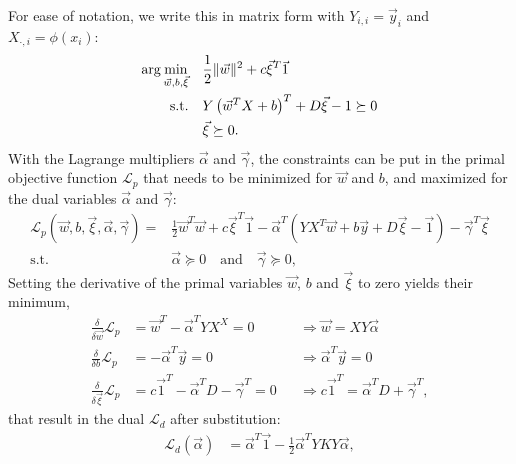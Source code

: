 %
For ease of notation, we write this in matrix form 
with $Y_{i,i} = \vec{y}_i$ and $X_{\cdot,i} = \phi(x_i)$:
\begin{align}
  \arg\min_{\vec{w}, b, \vec{\xi}} \quad
  & \frac{1}{2}\lVert\vec{w}\rVert^2
  + c\vec{\xi}^T\vec{1}
\\ \label{eq:dsvm_margin_error_const}
  \text{s.t.} \quad &
  Y \left(\vec{w}^T X + b\right)^T + D \vec{\xi} - 1 \succeq 0 
\\&
  \vec{\xi} \succeq 0.
\end{align}
%
With the Lagrange multipliers $\vec{\alpha}$ and $\vec{\gamma}$, the
constraints can be put in the primal objective function $\mathcal{L}_p$ that
needs to be minimized for $\vec{w}$ and $b$, and maximized for the
dual variables $\vec{\alpha}$ and $\vec{\gamma}$:
\begin{align}
  \mathcal{L}_p(\vec{w}, b, \vec{\xi}, \vec{\alpha}, \vec{\gamma})= & 
  \frac{1}{2} \vec{w}^T \vec{w}
  + c\vec{\xi}^T\vec{1}
  - \vec{\alpha}^T \left(
    Y X^T \vec{w} + b \vec{y}  + D \vec{\xi} - \vec{1}
    \right)
  - \vec{\gamma}^T \vec{\xi}
\\
  \text{s.t.} \quad &
  \vec{\alpha} \succeq 0 \quad \text{and} \quad \vec{\gamma} \succeq 0,
  \label{eq:dsvm_slack_const}
\end{align}
%
Setting the derivative of the primal variables $\vec{w}$, $b$ and $\vec{\xi}$ to zero yields their minimum,
\begin{align}
  \frac{\delta}{\delta \vec{w}} \mathcal{L}_p &= 
  \vec{w}^T - \vec{\alpha}^T Y X^X = 0
  &&\Rightarrow \vec{w} = X Y \vec{\alpha}
  \label{eq:dsvm_w_prime}
\\
  \frac{\delta}{\delta b} \mathcal{L}_p &= 
  -\vec{\alpha}^T \vec{y} = 0
  &&\Rightarrow \vec{\alpha}^T \vec{y} = 0
  \label{eq:dsvm_b_prime}
\\
  \frac{\delta}{\delta \vec{\xi}} \mathcal{L}_p &= 
  c\vec{1}^T - \vec{\alpha}^T D - \vec{\gamma}^T = 0
  &&\Rightarrow c\vec{1}^T = \vec{\alpha}^T D + \vec{\gamma}^T,
  \label{eq:dsvm_xi_prime}
\end{align}
%
that result in the dual $\mathcal{L}_d$ after substitution:
\begin{align} %
  \mathcal{L}_d (\vec{\alpha}) & =
  \vec{\alpha}^T \vec{1}
  - \frac{1}{2} \vec{\alpha}^T Y K Y \vec{\alpha},
\end{align}
